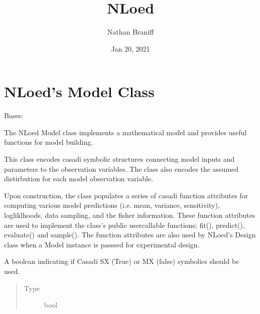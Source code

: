 \documentclass[letterpaper,10pt,english,openany,oneside]{sphinxmanual}
\title{NLoed}
\date{Jan 20, 2021}
\author{Nathan Braniff}
\begin{document}
\pagestyle{empty}
\sphinxmaketitle
\pagestyle{plain}
\sphinxtableofcontents
\pagestyle{normal}
\label{\detokenize{index::doc}}



\chapter{NLoed’s Model Class}
\label{\detokenize{nloed:module-nloed.model}}\label{\detokenize{nloed:nloed-s-model-class}}\label{\detokenize{nloed::doc}}

\begin{fulllineitems}
\label{\detokenize{nloed:nloed.model.Model}}
Bases: 

The NLoed Model class implements a mathematical model and provides useful functions for model building.

This class encodes casadi symbolic structures connecting model inputs and parameters to the
observation variables. The class also encodes the assumed distirbution for each model observation
variable.

Upon construction, the class populates a series of casadi function attributes for
computing various model predictions (i.e. mean, variance, sensitivity), logliklhoods, data
sampling, and the fisher information. These function attributes are used to implement the class’s
public user\sphinxhyphen{}callable functions; fit(), predict(), evaluate() and sample(). The function attributes
are also used by NLoed’s Design class when a Model instance is passsed for experimental design.

\begin{fulllineitems}
\label{\detokenize{nloed:nloed.model.Model.symbolics_boolean}}
A boolean indicating if Casadi SX (True) or MX (false) symbolics
should be used.
\begin{quote}\begin{description}
\item[{Type}] \leavevmode
bool


\end{description}
\end{quote}
\end{fulllineitems}
\end{fulllineitems}
\end{document}
